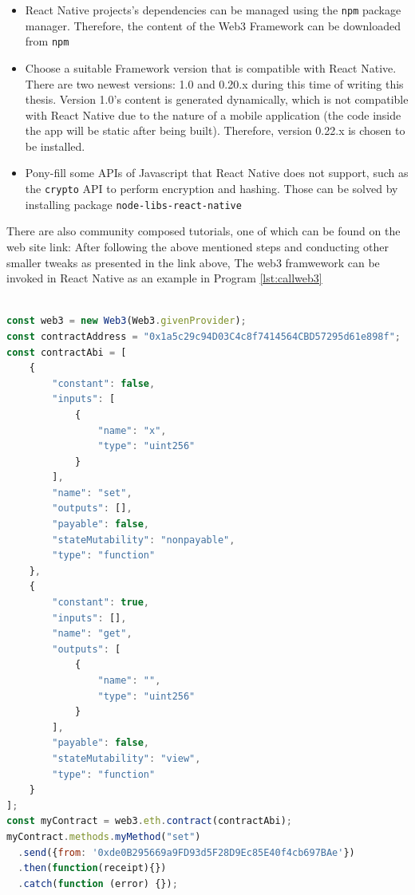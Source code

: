 \documentclass[twoside,numperchapter]{tutthesis} %
\begin{document}
\begin{itemize}
    \item React Native projects's dependencies can be managed using the \texttt{npm} package manager. Therefore, the content of the Web3 Framework can be downloaded from \texttt{npm}
    \item Choose a suitable Framework version that is compatible with React Native. There are two newest versions: 1.0 and 0.20.x during this time of writing this thesis. Version 1.0's content is generated dynamically, which is not compatible with React Native due to the nature of a mobile application (the code inside the app will be static after being built). Therefore, version 0.22.x is chosen to be installed.
    \item Pony-fill some APIs of Javascript that React Native does not support, such as the \texttt{crypto} API to perform encryption and hashing. Those can be solved by installing package \texttt{node-libs-react-native}
\end{itemize}

There are also community composed tutorials, one of which can be found on the web site link: \citep{InstallWeb3}
After following the above mentioned steps and conducting other smaller tweaks as presented in the link above, The web3 framwework can be invoked in React Native as an example in Program \ref{lst:callweb3}

\begin{lstlisting}[float,caption={Calling Web3 functions and making transactions on the Ethereum blockchain \citep{SolidityDocumentation}.},label={lst:callweb3},language=Javascript]

const web3 = new Web3(Web3.givenProvider);
const contractAddress = "0x1a5c29c94D03C4c8f7414564CBD57295d61e898f";
const contractAbi = [
	{
		"constant": false,
		"inputs": [
			{
				"name": "x",
				"type": "uint256"
			}
		],
		"name": "set",
		"outputs": [],
		"payable": false,
		"stateMutability": "nonpayable",
		"type": "function"
	},
	{
		"constant": true,
		"inputs": [],
		"name": "get",
		"outputs": [
			{
				"name": "",
				"type": "uint256"
			}
		],
		"payable": false,
		"stateMutability": "view",
		"type": "function"
	}
];
const myContract = web3.eth.contract(contractAbi);
myContract.methods.myMethod("set")
  .send({from: '0xde0B295669a9FD93d5F28D9Ec85E40f4cb697BAe'})
  .then(function(receipt){})
  .catch(function (error) {});

\end{lstlisting}
\end{document}
